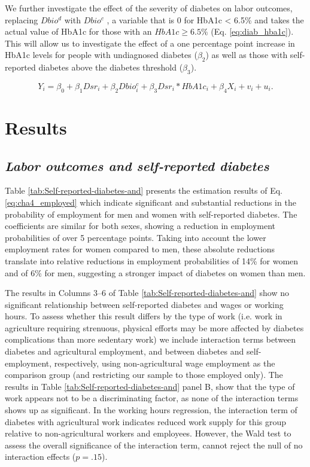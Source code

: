 \documentclass[12pt,english]{article}
\begin{document}
We further investigate the effect of the severity of diabetes on labor outcomes,
replacing $Dbio^{d}$ with $Dbio^{c}$ , a variable that is 0 for HbA1c < 6.5\% and takes the actual
value of \ac{HbA1c} for those with an $HbA1c \geq 6.5\%$ (Eq. \ref{eq:diab_hba1c}). This will allow us to investigate
the effect of a one percentage point increase in \ac{HbA1c} levels for people with undiagnosed
diabetes ($\beta_{2}$) as well as those with self-reported diabetes above the diabetes threshold
($\beta_{3}$).

\begin{equation}
Y_{i}=\beta_{0}+\beta_{1}Dsr_{i}+\beta_{2}Dbio^{c}_{i}+\beta_{3}Dsr_{i}*HbA1c_{i}+\beta_{4}X_{i}+v_{i}+u_{i}.\label{eq:diab_hba1c}
\end{equation}

\section{\label{sec:cha_4_results}Results}


\subsection{\textit{Labor outcomes and self-reported diabetes}}

Table \ref{tab:Self-reported-diabetes-and} presents the estimation results of Eq. \ref{eq:cha4_employed} which indicate significant and substantial reductions in the probability of employment for men and women with self-reported diabetes. The coefficients are similar for both sexes, showing a reduction in employment probabilities of over 5 percentage points. Taking into account the lower employment rates for women compared to men, these absolute reductions translate into relative reductions in employment probabilities of 14\% for women and of 6\% for men, suggesting a stronger impact of diabetes on women than men.

The results in Columns 3--6 of Table \ref{tab:Self-reported-diabetes-and} show no significant relationship between self-reported diabetes and wages or working hours. To assess whether this result differs by the type of work (i.e. work in agriculture requiring strenuous, physical efforts may be more affected by diabetes complications than more sedentary work) we include interaction terms between diabetes and agricultural employment, and between diabetes and self-employment, respectively, using non-agricultural wage employment as the comparison group (and restricting our sample to those employed only). The results in Table \ref{tab:Self-reported-diabetes-and} panel B, show that the type of work appears not to be a discriminating factor, as none of the interaction terms shows up as significant. In the working hours regression, the interaction term of diabetes with agricultural work indicates reduced work supply for this group relative to non-agricultural workers and employees. However, the Wald test to assess the overall significance of the interaction term, cannot  reject the null of no interaction effects ($p = .15$).
\end{document}
